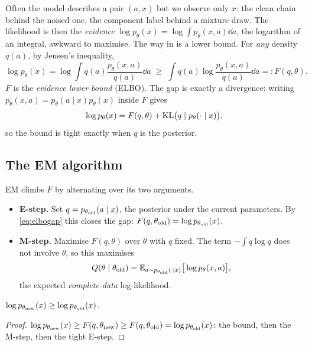 Often the model describes a pair $(a,x)$ but we observe only $x$: the clean chain behind the noised one, the
component label behind a mixture draw. The likelihood is then the \emph{evidence}
$\log p_\theta(x)=\log\int p_\theta(x,a)\dd a$, the logarithm of an integral, awkward to maximise. The way in is a
lower bound. For \emph{any} density $q(a)$, by Jensen's inequality,
\begin{equation}\label{eq:elbo}
  \log p_\theta(x)=\log\int q(a)\frac{p_\theta(x,a)}{q(a)}\dd a\;\ge\;\int q(a)\log\frac{p_\theta(x,a)}{q(a)}\dd a=:F(q,\theta).
\end{equation}
$F$ is the \emph{evidence lower bound} (ELBO). The gap is exactly a divergence: writing
$p_\theta(x,a)=p_\theta(a\mid x)p_\theta(x)$ inside $F$ gives
\begin{equation}\label{eq:elbogap}
  \log p_\theta(x)=F(q,\theta)+\mathrm{KL}\big(q\,\|\,p_\theta(\cdot\mid x)\big),
\end{equation}
so the bound is tight exactly when $q$ is the posterior.

\subsection{The EM algorithm}

EM climbs $F$ by alternating over its two arguments.
\begin{itemize}
\item \textbf{E-step.} Set $q=p_{\theta_{\rm old}}(a\mid x)$, the posterior under the current parameters. By
  \eqref{eq:elbogap} this closes the gap: $F(q,\theta_{\rm old})=\log p_{\theta_{\rm old}}(x)$.
\item \textbf{M-step.} Maximise $F(q,\theta)$ over $\theta$ with $q$ fixed. The term $-\int q\log q$ does not involve
  $\theta$, so this maximises
  \begin{equation}\label{eq:Q}
    Q(\theta\mid\theta_{\rm old})=\mathbb{E}_{a\sim p_{\theta_{\rm old}}(\cdot\mid x)}\big[\log p_\theta(x,a)\big],
  \end{equation}
  the expected \emph{complete-data} log-likelihood.
\end{itemize}

\begin{proposition}
$\log p_{\theta_{\rm new}}(x)\ge\log p_{\theta_{\rm old}}(x)$.
\end{proposition}
\begin{proof}
$\log p_{\theta_{\rm new}}(x)\ge F(q,\theta_{\rm new})\ge F(q,\theta_{\rm old})=\log p_{\theta_{\rm old}}(x)$: the bound, then the M-step,
then the tight E-step.
\end{proof}

